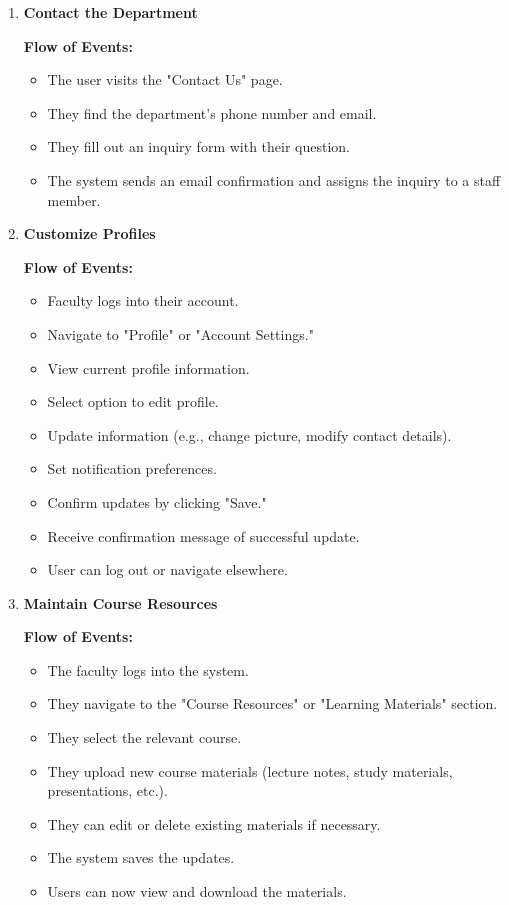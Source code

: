 \documentclass[11pt]{article}
\begin{document}
\begin{enumerate}
    \item \textbf{Contact the Department} \par
    \textbf{Flow of Events:}
    \begin{itemize}
        \item The user visits the "Contact Us" page.
        \item They find the department’s phone number and email.
        \item They fill out an inquiry form with their question.
        \item The system sends an email confirmation and assigns the inquiry to a staff member.
    \end{itemize}

    \item \textbf{Customize Profiles} \par
    \textbf{Flow of Events:}
    \begin{itemize}
        \item Faculty logs into their account.
        \item Navigate to "Profile" or "Account Settings."
        \item View current profile information.
        \item Select option to edit profile.
        \item Update information (e.g., change picture, modify contact details).
        \item Set notification preferences.
        \item Confirm updates by clicking "Save."
        \item Receive confirmation message of successful update.
        \item User can log out or navigate elsewhere.
    \end{itemize}

    \item \textbf{Maintain Course Resources} \par
    \textbf{Flow of Events:}
    \begin{itemize}
        \item The faculty logs into the system.
        \item They navigate to the "Course Resources" or "Learning Materials" section.
        \item They select the relevant course.
        \item They upload new course materials (lecture notes, study materials, presentations, etc.).
        \item They can edit or delete existing materials if necessary.
        \item The system saves the updates.
        \item Users can now view and download the materials.
    \end{itemize}


\end{enumerate}
\end{document}
